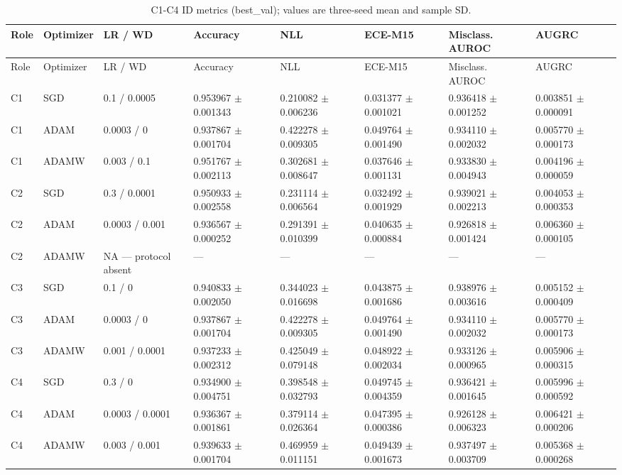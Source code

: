 \begin{longtable}{llllllll}
\caption{C1-C4 ID metrics (best\_val); values are three-seed mean and sample SD.}\\
Role & Optimizer & LR / WD & Accuracy & NLL & ECE-M15 & Misclass. AUROC & AUGRC \\
\hline
\endfirsthead
Role & Optimizer & LR / WD & Accuracy & NLL & ECE-M15 & Misclass. AUROC & AUGRC \\
\hline
\endhead
C1 & SGD & 0.1 / 0.0005 & 0.953967 $\pm$ 0.001343 & 0.210082 $\pm$ 0.006236 & 0.031377 $\pm$ 0.001021 & 0.936418 $\pm$ 0.001252 & 0.003851 $\pm$ 0.000091 \\
C1 & ADAM & 0.0003 / 0 & 0.937867 $\pm$ 0.001704 & 0.422278 $\pm$ 0.009305 & 0.049764 $\pm$ 0.001490 & 0.934110 $\pm$ 0.002032 & 0.005770 $\pm$ 0.000173 \\
C1 & ADAMW & 0.003 / 0.1 & 0.951767 $\pm$ 0.002113 & 0.302681 $\pm$ 0.008647 & 0.037646 $\pm$ 0.001131 & 0.933830 $\pm$ 0.004943 & 0.004196 $\pm$ 0.000059 \\
C2 & SGD & 0.3 / 0.0001 & 0.950933 $\pm$ 0.002558 & 0.231114 $\pm$ 0.006564 & 0.032492 $\pm$ 0.001929 & 0.939021 $\pm$ 0.002213 & 0.004053 $\pm$ 0.000353 \\
C2 & ADAM & 0.0003 / 0.001 & 0.936567 $\pm$ 0.000252 & 0.291391 $\pm$ 0.010399 & 0.040635 $\pm$ 0.000884 & 0.926818 $\pm$ 0.001424 & 0.006360 $\pm$ 0.000105 \\
C2 & ADAMW & NA — protocol absent & — & — & — & — & — \\
C3 & SGD & 0.1 / 0 & 0.940833 $\pm$ 0.002050 & 0.344023 $\pm$ 0.016698 & 0.043875 $\pm$ 0.001686 & 0.938976 $\pm$ 0.003616 & 0.005152 $\pm$ 0.000409 \\
C3 & ADAM & 0.0003 / 0 & 0.937867 $\pm$ 0.001704 & 0.422278 $\pm$ 0.009305 & 0.049764 $\pm$ 0.001490 & 0.934110 $\pm$ 0.002032 & 0.005770 $\pm$ 0.000173 \\
C3 & ADAMW & 0.001 / 0.0001 & 0.937233 $\pm$ 0.002312 & 0.425049 $\pm$ 0.079148 & 0.048922 $\pm$ 0.002034 & 0.933126 $\pm$ 0.000965 & 0.005906 $\pm$ 0.000315 \\
C4 & SGD & 0.3 / 0 & 0.934900 $\pm$ 0.004751 & 0.398548 $\pm$ 0.032793 & 0.049745 $\pm$ 0.004359 & 0.936421 $\pm$ 0.001645 & 0.005996 $\pm$ 0.000592 \\
C4 & ADAM & 0.0003 / 0.0001 & 0.936367 $\pm$ 0.001861 & 0.379114 $\pm$ 0.026364 & 0.047395 $\pm$ 0.000386 & 0.926128 $\pm$ 0.006323 & 0.006421 $\pm$ 0.000206 \\
C4 & ADAMW & 0.003 / 0.001 & 0.939633 $\pm$ 0.001704 & 0.469959 $\pm$ 0.011151 & 0.049439 $\pm$ 0.001673 & 0.937497 $\pm$ 0.003709 & 0.005368 $\pm$ 0.000268 \\
\end{longtable}
